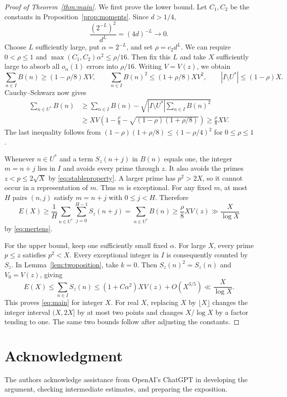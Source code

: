 \documentclass[11pt,reqno]{amsart}
\theoremstyle{remark}
\numberwithin{equation}{section}
\begin{document}
\begin{proof}[Proof of Theorem~\ref{thm:main}]
We first prove the lower bound. Let $C_1,C_2$ be the constants in
Proposition~\ref{prop:moments}.
Since $d>1/4$,
\[
 \frac{(2^{-L})^2}{d^L}=(4d)^{-L}\longrightarrow0.
\]
Choose $L$ sufficiently large, put $\alpha=2^{-L}$, and set
$\rho=c_2d^L$. We can require $0<\rho\leq1$ and
$\max(C_1,C_2)\alpha^2\leq\rho/16$.
Then fix this $L$ and take $X$ sufficiently large to absorb all
$o_\alpha(1)$ errors into $\rho/16$.
Writing $V=V(z)$, we obtain
\[
 \sum_{n\in I}B(n)\geq(1-\rho/8)XV,
 \qquad
 \sum_{n\in I}B(n)^2\leq(1+\rho/8)XV^2,
 \qquad |I\setminus U^*|\leq(1-\rho)X.
\]
Cauchy--Schwarz now gives
\begin{align*}
 \sum_{n\in U^*}B(n)
 &\geq \sum_{n\in I}B(n)
   -\sqrt{|I\setminus U^*|\sum_{n\in I}B(n)^2}\\
 &\geq XV\left(1-\frac\rho8
             -\sqrt{(1-\rho)(1+\rho/8)}\right)
 \geq\frac\rho8 XV.
\end{align*}
The last inequality follows from
$(1-\rho)(1+\rho/8)\leq(1-\rho/4)^2$ for $0\leq\rho\leq1$.

Whenever $n\in U^*$ and a term $S_z(n+j)$ in $B(n)$ equals one,
the integer $m=n+j$ lies in $I$ and avoids every prime through $z$.
It also avoids the primes $z<p\leq2\sqrt X$ by
\eqref{eq:stableproperty}.
A larger prime has $p^2>2X$, so it cannot occur in a representation
of $m$. Thus $m$ is exceptional.
For any fixed $m$, at most $H$ pairs $(n,j)$ satisfy $m=n+j$ with
$0\leq j<H$. Therefore
\[
 E(X)\geq\frac1H\sum_{n\in U^*}\sum_{j=0}^{H-1}S_z(n+j)
 =\sum_{n\in U^*}B(n)\geq\frac\rho8 XV(z)
 \gg\frac{X}{\log X}
\]
by \eqref{eq:mertens}.

For the upper bound, keep one sufficiently small fixed $\alpha$.
For large $X$, every prime $p\leq z$ satisfies $p^2<X$.
Every exceptional integer in $I$ is consequently counted by $S_z$.
In Lemma~\ref{lem:twoposition}, take $k=0$.
Then $S_z(n)^2=S_z(n)$ and $V_0=V(z)$, giving
\[
 E(X)\leq\sum_{n\in I}S_z(n)
 \leq(1+C\alpha^2)XV(z)+O(X^{3/5})
 \ll\frac{X}{\log X}.
\]
This proves \eqref{eq:main} for integer $X$.
For real $X$, replacing $X$ by $\lfloor X\rfloor$ changes the
integer interval $(X,2X]$ by at most two points and changes
$X/\log X$ by a factor tending to one.
The same two bounds follow after adjusting the constants.
\end{proof}

\section*{Acknowledgment}
The authors acknowledge assistance from OpenAI's ChatGPT in developing
the argument, checking intermediate estimates, and preparing the exposition.
\end{document}
